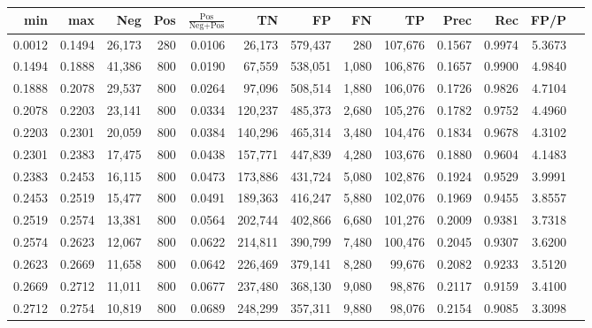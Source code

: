 \begin{tabular}{rrrrrrrrrrrrr}
\toprule
   min &    max &    Neg &   Pos & $\frac{\text{Pos}}{\text{Neg}+\text{Pos}}$ &      TN &      FP &      FN &      TP &   Prec &    Rec &   FP/P \\
\midrule
0.0012 & 0.1494 & 26,173 &   280 &                                     0.0106 &  26,173 & 579,437 &     280 & 107,676 & 0.1567 & 0.9974 & 5.3673 \\
0.1494 & 0.1888 & 41,386 &   800 &                                     0.0190 &  67,559 & 538,051 &   1,080 & 106,876 & 0.1657 & 0.9900 & 4.9840 \\
0.1888 & 0.2078 & 29,537 &   800 &                                     0.0264 &  97,096 & 508,514 &   1,880 & 106,076 & 0.1726 & 0.9826 & 4.7104 \\
0.2078 & 0.2203 & 23,141 &   800 &                                     0.0334 & 120,237 & 485,373 &   2,680 & 105,276 & 0.1782 & 0.9752 & 4.4960 \\
0.2203 & 0.2301 & 20,059 &   800 &                                     0.0384 & 140,296 & 465,314 &   3,480 & 104,476 & 0.1834 & 0.9678 & 4.3102 \\
0.2301 & 0.2383 & 17,475 &   800 &                                     0.0438 & 157,771 & 447,839 &   4,280 & 103,676 & 0.1880 & 0.9604 & 4.1483 \\
0.2383 & 0.2453 & 16,115 &   800 &                                     0.0473 & 173,886 & 431,724 &   5,080 & 102,876 & 0.1924 & 0.9529 & 3.9991 \\
0.2453 & 0.2519 & 15,477 &   800 &                                     0.0491 & 189,363 & 416,247 &   5,880 & 102,076 & 0.1969 & 0.9455 & 3.8557 \\
0.2519 & 0.2574 & 13,381 &   800 &                                     0.0564 & 202,744 & 402,866 &   6,680 & 101,276 & 0.2009 & 0.9381 & 3.7318 \\
0.2574 & 0.2623 & 12,067 &   800 &                                     0.0622 & 214,811 & 390,799 &   7,480 & 100,476 & 0.2045 & 0.9307 & 3.6200 \\
0.2623 & 0.2669 & 11,658 &   800 &                                     0.0642 & 226,469 & 379,141 &   8,280 &  99,676 & 0.2082 & 0.9233 & 3.5120 \\
0.2669 & 0.2712 & 11,011 &   800 &                                     0.0677 & 237,480 & 368,130 &   9,080 &  98,876 & 0.2117 & 0.9159 & 3.4100 \\
0.2712 & 0.2754 & 10,819 &   800 &                                     0.0689 & 248,299 & 357,311 &   9,880 &  98,076 & 0.2154 & 0.9085 & 3.3098 \\

\end{tabular}
